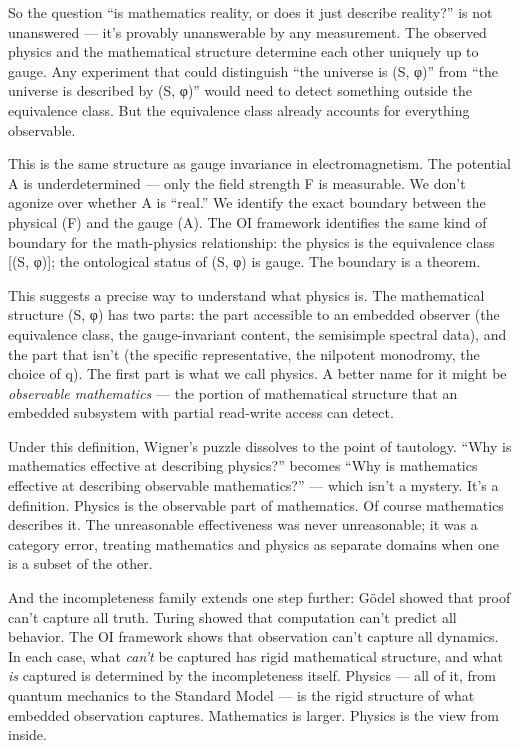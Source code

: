 \documentclass[
]{article}
\begin{document}
So the question ``is mathematics reality, or does it just describe
reality?'' is not unanswered --- it's provably unanswerable by any
measurement. The observed physics and the mathematical structure
determine each other uniquely up to gauge. Any experiment that could
distinguish ``the universe is (S, φ)'' from ``the universe is described
by (S, φ)'' would need to detect something outside the equivalence
class. But the equivalence class already accounts for everything
observable.

This is the same structure as gauge invariance in electromagnetism. The
potential A is underdetermined --- only the field strength F is
measurable. We don't agonize over whether A is ``real.'' We identify the
exact boundary between the physical (F) and the gauge (A). The OI
framework identifies the same kind of boundary for the math-physics
relationship: the physics is the equivalence class {[}(S, φ){]}; the
ontological status of (S, φ) is gauge. The boundary is a theorem.

This suggests a precise way to understand what physics is. The
mathematical structure (S, φ) has two parts: the part accessible to an
embedded observer (the equivalence class, the gauge-invariant content,
the semisimple spectral data), and the part that isn't (the specific
representative, the nilpotent monodromy, the choice of q). The first
part is what we call physics. A better name for it might be
\emph{observable mathematics} --- the portion of mathematical structure
that an embedded subsystem with partial read-write access can detect.

Under this definition, Wigner's puzzle dissolves to the point of
tautology. ``Why is mathematics effective at describing physics?''
becomes ``Why is mathematics effective at describing observable
mathematics?'' --- which isn't a mystery. It's a definition. Physics is
the observable part of mathematics. Of course mathematics describes it.
The unreasonable effectiveness was never unreasonable; it was a category
error, treating mathematics and physics as separate domains when one is
a subset of the other.

And the incompleteness family extends one step further: Gödel showed
that proof can't capture all truth. Turing showed that computation can't
predict all behavior. The OI framework shows that observation can't
capture all dynamics. In each case, what \emph{can't} be captured has
rigid mathematical structure, and what \emph{is} captured is determined
by the incompleteness itself. Physics --- all of it, from quantum
mechanics to the Standard Model --- is the rigid structure of what
embedded observation captures. Mathematics is larger. Physics is the
view from inside.
\end{document}
